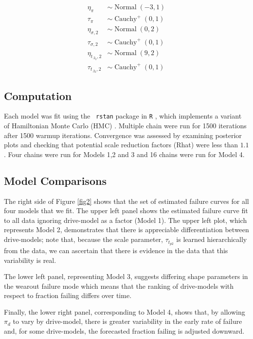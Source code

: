 \documentclass[12pt]{article}
\newcommand{\op}{\operatorname}
\begin{document}
\begin{align*}
  \eta_{\pi} & \sim \op{Normal}(-3, 1)\\
  \tau_{\pi} & \sim \op{Cauchy}^+(0, 1)\\
  \eta_{\sigma ,2} & \sim \op{Normal}(0, 2)\\
  \tau_{\sigma ,2} & \sim \op{Cauchy}^+(0, 1)\\
  \eta_{t_{.2_2},2} & \sim \op{Normal}(9, 2)\\
  \tau_{t_{.2_2},2} & \sim \op{Cauchy}^+(0, 1)
 \end{align*} 

\subsection{Computation}
\label{sec:Computation}
Each model was fit using the {\tt
  rstan}\cite{rstan} package in {\tt R} \cite{r}, which implements a variant of Hamiltonian Monte Carlo (HMC)
\cite{betancourt}. Multiple chain were run for 1500 iterations after 1500 warmup iterations. Convergence was assessed by examining posterior
plots and checking that potential scale reduction factors (Rhat) \cite{gelman2014bayesian} were less than $1.1$. Four chains were run for Models 1,2 and 3 and 16 chains were run for Model 4.



\subsection{Model Comparisons}
\label{sec:Model Comparisons}
The right side of Figure \ref{fig2} shows that the set of estimated failure curves for all four models that we fit. The upper left panel shows the estimated failure curve fit to all data ignoring drive-model as a factor (Model 1). The upper left plot, which represents Model 2, demonstrates that there is appreciable differentiation between drive-models; note that, because the scale parameter, $\tau_{t_{p2}}$ is learned hierarchically from the data, we can ascertain that there is evidence in the data that this variability is real.

The lower left panel, representing Model 3, suggests differing shape parameters in the wearout failure mode which means that the ranking of drive-models with respect to fraction failing differs over time.

Finally, the lower right panel, corresponding to Model 4, shows that, by allowing $\pi_d$ to vary by drive-model, there is greater variability in the early rate of failure and, for some drive-models, the forecasted fraction failing is adjusted downward. 
\end{document}
